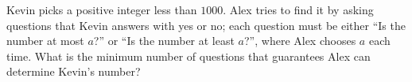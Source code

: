 Kevin picks a positive integer less than $1000$. Alex tries to find it by asking questions that Kevin answers with yes or no; each question must be either ``Is the number at most $a$?'' or ``Is the number at least $a$?'', where Alex chooses $a$ each time. What is the minimum number of questions that guarantees Alex can determine Kevin's number?
